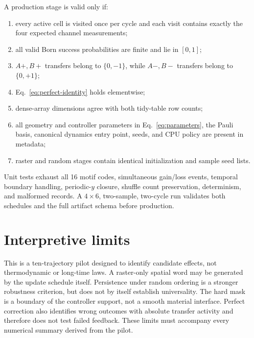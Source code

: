 \documentclass[aps,prb,onecolumn,nofootinbib,superscriptaddress]{revtex4-2}
\begin{document}
A production stage is valid only if:
\begin{enumerate}
 \item every active cell is visited once per cycle and each visit contains
       exactly the four expected channel measurements;
 \item all valid Born success probabilities are finite and lie in \([0,1]\);
 \item \(A+,B+\) transfers belong to \(\{0,-1\}\), while \(A-,B-\) transfers
       belong to \(\{0,+1\}\);
 \item Eq.~\eqref{eq:perfect-identity} holds elementwise;
 \item dense-array dimensions agree with both tidy-table row counts;
 \item all geometry and controller parameters in Eq.~\eqref{eq:parameters},
       the Pauli basis, canonical dynamics entry point, seeds, and CPU policy
       are present in metadata;
 \item raster and random stages contain identical initialization and sample
       seed lists.
\end{enumerate}
Unit tests exhaust all 16 motif codes, simultaneous gain/loss events, temporal
boundary handling, periodic-\(y\) closure, shuffle count preservation,
determinism, and malformed records.  A \(4\times6\), two-sample, two-cycle run
validates both schedules and the full artifact schema before production.

\section{Interpretive limits}

This is a ten-trajectory pilot designed to identify candidate effects, not
thermodynamic or long-time laws.  A raster-only spatial word may be generated
by the update schedule itself.  Persistence under random ordering is a
stronger robustness criterion, but does not by itself establish universality.
The hard mask is a boundary of the controller support, not a smooth material
interface.  Perfect correction also identifies wrong outcomes with absolute
transfer activity and therefore does not test failed feedback.  These limits
must accompany every numerical summary derived from the pilot.
\end{document}
